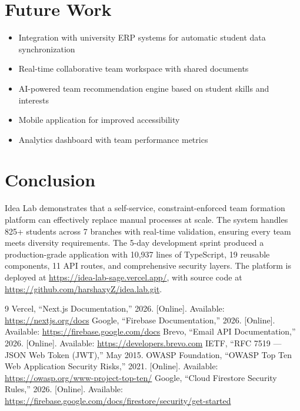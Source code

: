 \documentclass[conference]{IEEEtran}
\begin{document}
\section{Future Work}

\begin{itemize}[noitemsep,topsep=3pt]
    \item Integration with university ERP systems for automatic student data synchronization
    \item Real-time collaborative team workspace with shared documents
    \item AI-powered team recommendation engine based on student skills and interests
    \item Mobile application for improved accessibility
    \item Analytics dashboard with team performance metrics
\end{itemize}

\section{Conclusion}

Idea Lab demonstrates that a self-service, constraint-enforced team formation platform can effectively replace manual processes at scale. The system handles 825+ students across 7 branches with real-time validation, ensuring every team meets diversity requirements. The 5-day development sprint produced a production-grade application with 10,937 lines of TypeScript, 19 reusable components, 11 API routes, and comprehensive security layers. The platform is deployed at \url{https://idea-lab-sage.vercel.app/}, with source code at \url{https://github.com/harshaxyZ/idea.lab.git}.

\balance
\begin{thebibliography}{9}
 Vercel, ``Next.js Documentation,'' 2026. [Online]. Available: \url{https://nextjs.org/docs}
 Google, ``Firebase Documentation,'' 2026. [Online]. Available: \url{https://firebase.google.com/docs}
 Brevo, ``Email API Documentation,'' 2026. [Online]. Available: \url{https://developers.brevo.com}
 IETF, ``RFC 7519 --- JSON Web Token (JWT),'' May 2015.
 OWASP Foundation, ``OWASP Top Ten Web Application Security Risks,'' 2021. [Online]. Available: \url{https://owasp.org/www-project-top-ten/}
 Google, ``Cloud Firestore Security Rules,'' 2026. [Online]. Available: \url{https://firebase.google.com/docs/firestore/security/get-started}
\end{thebibliography}
\end{document}
